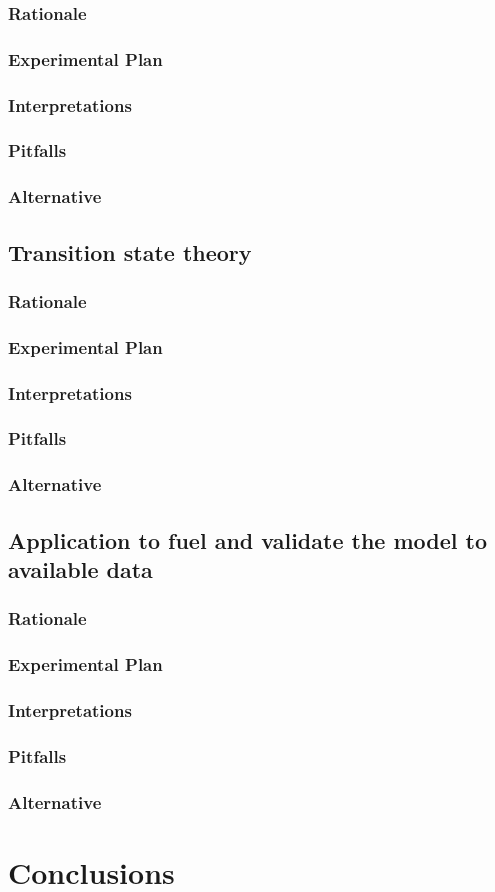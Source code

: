 \documentclass[12pt]{article}
\begin{document}
\subsubsection{Rationale}
\subsubsection{Experimental Plan}
\subsubsection{Interpretations}
\subsubsection{Pitfalls}
\subsubsection{Alternative}

\subsection{Transition state theory}
\subsubsection{Rationale}
\subsubsection{Experimental Plan}
\subsubsection{Interpretations}
\subsubsection{Pitfalls}
\subsubsection{Alternative}

\subsection{Application to fuel and validate the model to available data}
\subsubsection{Rationale}
\subsubsection{Experimental Plan}
\subsubsection{Interpretations}
\subsubsection{Pitfalls}
\subsubsection{Alternative}

\section{Conclusions}
\end{document}
